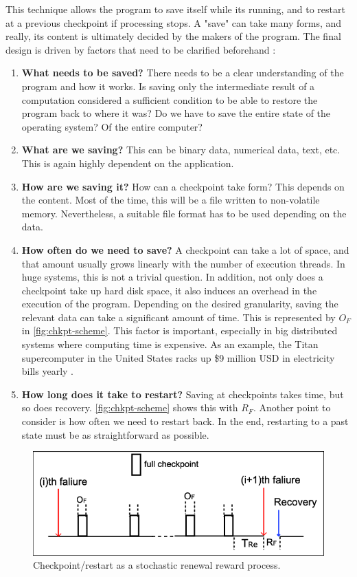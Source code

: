 {This technique allows the program to save itself while its running, and to restart at a previous checkpoint if processing stops. A "save" can take many forms, and really, its content is ultimately decided by the makers of the program. The final design is driven by factors that need to be clarified beforehand :
\begin{enumerate}
	\item \textbf{What needs to be saved?} There needs to be a clear understanding of the program and how it works. Is saving only the intermediate result of a computation considered a sufficient condition to be able to restore the program back to where it was? Do we have to save the entire state of the operating system? Of the entire computer? 
	\item \textbf{What are we saving?} This can be binary data, numerical data, text, etc. This is again highly dependent on the application.
	\item \textbf{How are we saving it?} How can a checkpoint take form? This depends on the content. Most of the time, this will be a file written to non-volatile memory. Nevertheless, a suitable file format has to be used depending on the data.
	\item \textbf{How often do we need to save?} A checkpoint can take a lot of space, and that amount usually grows linearly with the number of execution threads. In huge systems, this is not a trivial question. In addition, not only does a checkpoint take up hard disk space, it also induces an overhead in the execution of the program. Depending on the desired granularity, saving the relevant data can take a significant amount of time. This is represented by $O_F$ in \autoref{fig:chkpt-scheme}. This factor is important, especially in big distributed systems where computing time is expensive. As an example, the Titan supercomputer in the United States racks up \$9 million USD in electricity bills yearly \cite{online:henn}.
	\item \textbf{How long does it take to restart?} Saving at checkpoints takes time, but so does recovery. \autoref{fig:chkpt-scheme} shows this with $R_F$. Another point to consider is how often we need to restart back. In the end, restarting to a past state must be as straightforward as possible.
\end{enumerate}
\begin{figure}[H]
	\centering
	\includegraphics[width=0.9\linewidth, keepaspectratio]{art/checkpoint-scheme.png}
	\caption{Checkpoint/restart as a stochastic renewal reward process.}
	\label{fig:chkpt-scheme}
\end{figure}

}
